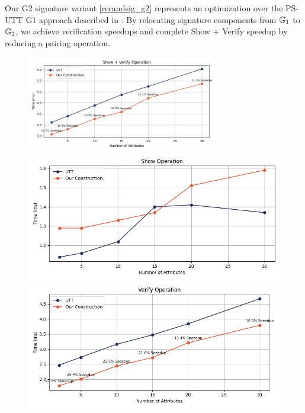 Our G2 signature variant \ref{rerandsig_g2} represents an optimization over the PS-UTT G1 approach described in \cite{tomescu_utt_2022}. By relocating signature components from $\mathbb{G}_1$ to $\mathbb{G}_2$, we achieve verification speedups and complete Show + Verify speedup by reducing a pairing operation. 


\begin{figure}
    \centering
    \begin{minipage}{\textwidth}
        \centering
        \includegraphics[width=0.75\textwidth]{figures/show_verify_utt_g2.png}
    \end{minipage}
    
    \vspace{0.05cm}

    \vspace{0.05cm}
    
    \begin{minipage}{0.48\textwidth}
        \centering
        \includegraphics[width=\textwidth]{figures/show_utt_g2.png}
    \end{minipage}
    \hfill
    \begin{minipage}{0.48\textwidth}
        \centering
        \includegraphics[width=\textwidth]{figures/verify_utt_g2.png}
    \end{minipage}
    

\end{figure}
